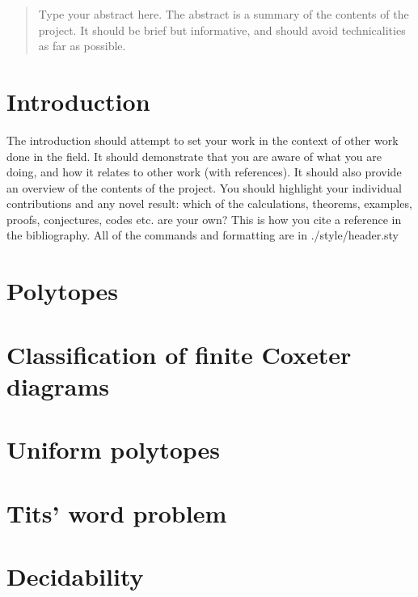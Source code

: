 \documentclass[a4paper,11pt, titlepage]{article}
\begin{document}
\begin{titlepage}

\end{titlepage}

\begin{abstract}
Type your abstract here. The abstract is a summary of the contents of the project. It should be brief but informative, and
should avoid technicalities as far as possible.
\end{abstract}

\tableofcontents
\clearpage

\section{Introduction}
The introduction should attempt to set your work in the context of other work done in the field. It
should demonstrate that you are aware of what you are doing, and how it relates to other work
(with references). It should also provide an overview of the contents of the project. You should
highlight your individual contributions and any novel result: which of the calculations, theorems,
examples, proofs, conjectures, codes etc. are your own? This is how you cite a reference in the bibliography\cite{Riemann2024}. All of the commands and formatting are in ./style/header.sty

\section{Polytopes}


\section{Classification of finite Coxeter diagrams}


\section{Uniform polytopes}


\section{Tits' word problem}


\section{Decidability}



\end{document}
